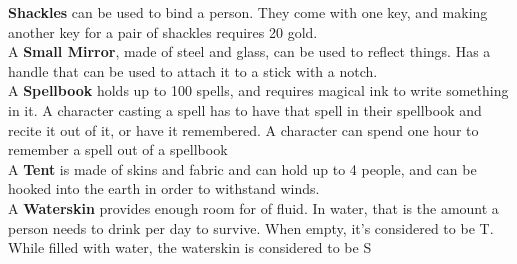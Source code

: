 \textbf{Shackles} can be used to bind a person.
They come with one key, and making another key for a pair of shackles requires 20 gold.\\

A \textbf{Small Mirror}, made of steel and glass, can be used to reflect things.
Has a handle that can be used to attach it to a stick with a notch.\\

A \textbf{Spellbook} holds up to 100 spells, and requires magical ink to write something in it.
A character casting a spell has to have that spell in their spellbook and recite it out of it, or have it remembered.
A character can spend one hour to remember a spell out of a spellbook\\

A \textbf{Tent} is made of skins and fabric and can hold up to 4 people, and can be hooked into the earth in order to withstand winds.\\

A \textbf{Waterskin} provides enough room for  of fluid.
In water, that is the amount a person needs to drink per day to survive.
When empty, it's considered to be T.
While filled with water, the waterskin is considered to be S\\